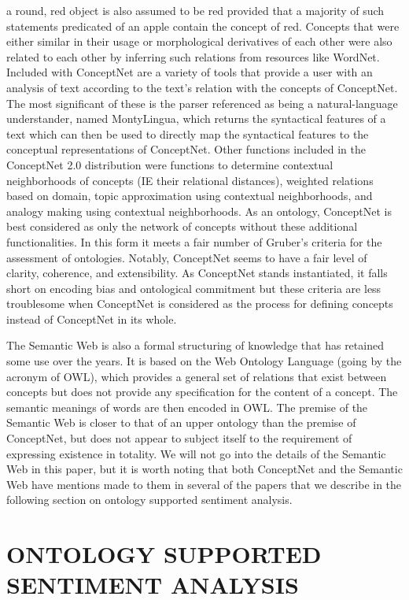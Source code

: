 \documentclass[letterpaper, 10 pt, conference]{ieeeconf}
\begin{document}
a round, red object is also assumed to be red provided that a majority of such statements predicated of an apple contain the concept of red. Concepts that were either similar in their usage or morphological derivatives of each other were also related to each other by inferring such relations from resources like WordNet. Included with ConceptNet are a variety of tools that provide a user with an analysis of text according to the text's relation with the concepts of ConceptNet. The most significant of these is the parser referenced as being a natural-language understander, named MontyLingua, which returns the syntactical features of a text which can then be used to directly map the syntactical features to the conceptual representations of ConceptNet. Other functions included in the ConceptNet 2.0 distribution were functions to determine contextual neighborhoods of concepts (IE their relational distances), weighted relations based on domain, topic approximation using contextual neighborhoods, and analogy making using contextual neighborhoods. As an ontology, ConceptNet is best considered as only the network of concepts without these additional functionalities. In this form it meets a fair number of Gruber's criteria for the assessment of ontologies. Notably, ConceptNet seems to have a fair level of clarity, coherence, and extensibility. As ConceptNet stands instantiated, it falls short on encoding bias and ontological commitment but these criteria are less troublesome when ConceptNet is considered as the process for defining concepts instead of ConceptNet in its whole.

The Semantic Web is also a formal structuring of knowledge that has retained some use over the years. It is based on the Web Ontology Language (going by the acronym of OWL), which provides a general set of relations that exist between concepts but does not provide any specification for the content of a concept. The semantic meanings of words are then encoded in OWL. The premise of the Semantic Web is closer to that of an upper ontology than the premise of ConceptNet, but does not appear to subject itself to the requirement of expressing existence in totality. We will not go into the details of the Semantic Web in this paper, but it is worth noting that both ConceptNet and the Semantic Web have mentions made to them in several of the papers that we describe in the following section on ontology supported sentiment analysis.

\section{ONTOLOGY SUPPORTED SENTIMENT ANALYSIS}
\end{document}
